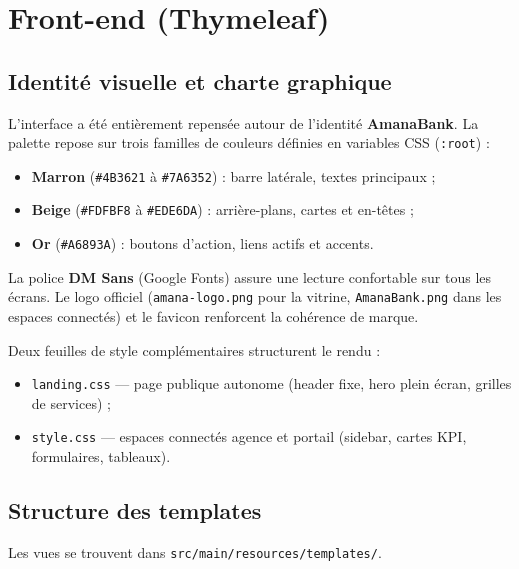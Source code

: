 \section{Front-end (Thymeleaf)}

\subsection{Identité visuelle et charte graphique}

L'interface a été entièrement repensée autour de l'identité \textbf{AmanaBank}. La palette repose sur trois familles de couleurs définies en variables CSS (\texttt{:root}) :

\begin{itemize}[leftmargin=*]
    \item \textbf{Marron} (\texttt{\#4B3621} à \texttt{\#7A6352}) : barre latérale, textes principaux ;
    \item \textbf{Beige} (\texttt{\#FDFBF8} à \texttt{\#EDE6DA}) : arrière-plans, cartes et en-têtes ;
    \item \textbf{Or} (\texttt{\#A6893A}) : boutons d'action, liens actifs et accents.
\end{itemize}

La police \textbf{DM Sans} (Google Fonts) assure une lecture confortable sur tous les écrans. Le logo officiel (\texttt{amana-logo.png} pour la vitrine, \texttt{AmanaBank.png} dans les espaces connectés) et le favicon renforcent la cohérence de marque.

Deux feuilles de style complémentaires structurent le rendu :
\begin{itemize}[leftmargin=*]
    \item \texttt{landing.css} — page publique autonome (header fixe, hero plein écran, grilles de services) ;
    \item \texttt{style.css} — espaces connectés agence et portail (sidebar, cartes KPI, formulaires, tableaux).
\end{itemize}

\subsection{Structure des templates}

Les vues se trouvent dans \texttt{src/main/resources/templates/}.

